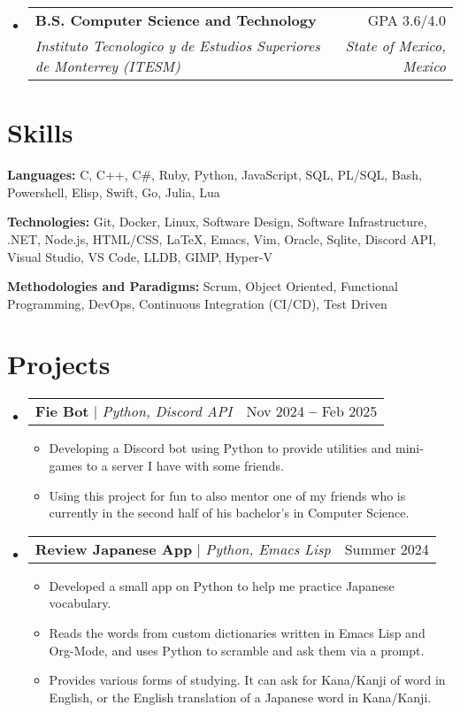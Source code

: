 \documentclass[letterpaper, 11pt]{article}
\makeatletter
\newcommand{\resumeSchoolHeading}[4]{
  \vspace{-5pt}\item
  \begin{tabular*}{0.97\textwidth}[t]{l@{\extracolsep{\fill}}r}
    \textbf{#1} & #2 \\
    \textit{\small#3} & \textit{\small#4}
  \end{tabular*}\vspace{-5pt}
}
\newcommand{\resumeProjectHeading}[3]{
  \vspace{-2pt}\item
  \begin{tabular*}{0.97\textwidth}{l@{\extracolsep{\fill}}r}
    \textbf{#1} $|$ \small\textit{#2} & #3
  \end{tabular*}\vspace{-9pt}
}
\newcommand{\resumeItem}[1]{
  \item\small{
    {#1 \vspace{-2pt}}
  }
}
\newcommand{\resumeSkillList}[2]{
  \textbf{#1:}{ #2 } \\ \vspace{1.5pt}
}
\makeatother
\begin{document}
\begin{itemize}[leftmargin=0.15in, label={}]
  \resumeSchoolHeading
      {B.S. Computer Science and Technology}{GPA 3.6/4.0}
      {Instituto Tecnologico y de Estudios Superiores de Monterrey (ITESM)}{State of Mexico, Mexico}
\end{itemize}


\section{Skills}
\vspace{1pt}

\begin{itemize}[leftmargin=0.15in, label={}]
  \small{\item{
    \resumeSkillList
      {Languages}{C, C++, C\#, Ruby, Python, JavaScript, SQL, PL/SQL, Bash, Powershell, Elisp, Swift, Go, Julia, Lua}
    \resumeSkillList
      {Technologies}{Git, Docker, Linux, Software Design, Software Infrastructure, .NET, Node.js, HTML/CSS, LaTeX, Emacs, Vim, Oracle, Sqlite, Discord API, Visual Studio, VS Code, LLDB, GIMP, Hyper-V}
    \resumeSkillList
      {Methodologies and Paradigms}{Scrum, Object Oriented, Functional Programming, DevOps, Continuous Integration (CI/CD), Test Driven}
  }}
\end{itemize}


\section{Projects}
\vspace{1pt}
\begin{itemize}[leftmargin=0.15in, label={}]

  \resumeProjectHeading
    {Fie Bot}{Python, Discord API}{Nov 2024 \textbf{--} Feb 2025}

  \begin{itemize}
    \resumeItem{Developing a Discord bot using Python to provide utilities and mini-games to a server I have with some friends.}
    \resumeItem{Using this project for fun to also mentor one of my friends who is currently in the second half of his bachelor's in Computer Science.}
  \end{itemize}\vspace{-5pt}

  \resumeProjectHeading
    {Review Japanese App}{Python, Emacs Lisp}{Summer 2024}

    \begin{itemize}
      \resumeItem{Developed a small app on Python to help me practice Japanese vocabulary.}
      \resumeItem{Reads the words from custom dictionaries written in Emacs Lisp and Org-Mode, and uses Python to scramble and ask them via a prompt.}
      \resumeItem{Provides various forms of studying. It can ask for Kana/Kanji of word in English, or the English translation of a Japanese word in Kana/Kanji.}
    \end{itemize}\vspace{-5pt}
\end{itemize}
\end{document}
